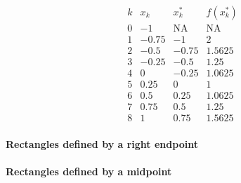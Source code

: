 \documentclass{ximera}
\begin{document}
\[
\begin{array}{c|c|c|c}
  k &  x_k  & x^*_k & f(x^*_k) \\ \hline
  0 & -1    & \text{NA} & \text{NA}  \\
  1 & -0.75 & -1    &   2      \\
  2 & -0.5  & -0.75 & 1.5625   \\
  3 & -0.25 & -0.5  & 1.25     \\
  4 &  0    & -0.25 & 1.0625   \\
  5 &  0.25 &  0    & 1        \\
  6 &  0.5  &  0.25 & 1.0625   \\
  7 &  0.75 &  0.5  & 1.25     \\
  8 &  1    &  0.75 & 1.5625   
\end{array}
\]

\paragraph{Rectangles defined by a right endpoint}


\paragraph{Rectangles defined by a midpoint}
\end{document}
